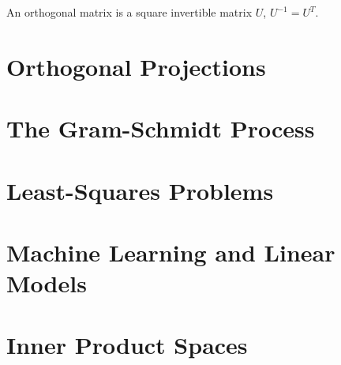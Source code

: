 \documentclass[../linalg.tex]{subfiles}
\begin{document}
An orthogonal matrix is a square invertible matrix $U$, $U^{-1}=U^T$.
\section{Orthogonal Projections}
\section{The Gram-Schmidt Process}
\section{Least-Squares Problems}
\section{Machine Learning and Linear Models}
\section{Inner Product Spaces}
\end{document}
